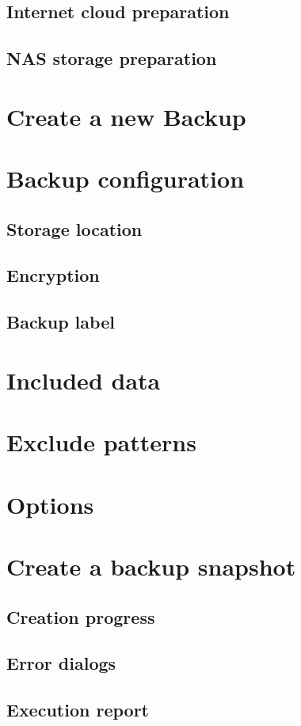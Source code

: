 \subsection{Internet cloud preparation}
\subsection{NAS storage preparation}
\section{Create a new Backup}
\section{Backup configuration}
\subsection{Storage location}
\subsection{Encryption}
\subsection{Backup label}
\section{Included data}
\section{Exclude patterns}
\section{Options}
\section{Create a backup snapshot}
\subsection{Creation progress}
\subsection{Error dialogs}
\subsection{Execution report}
